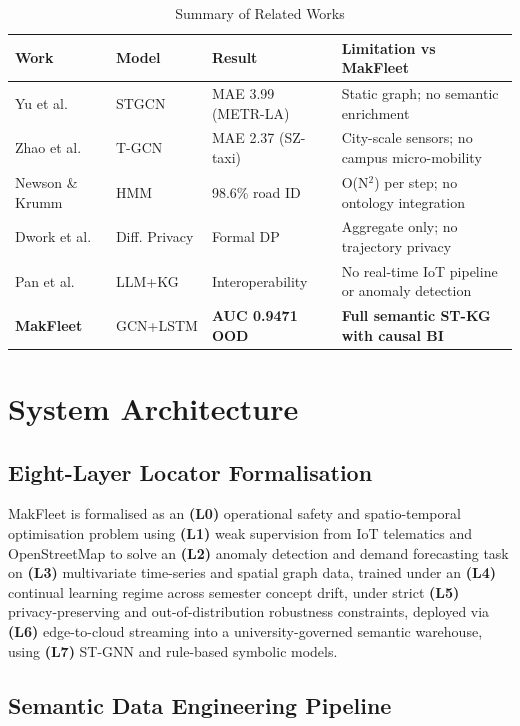 \documentclass[conference]{IEEEtran}
\begin{document}
\begin{table}[t]
\caption{Summary of Related Works}
\label{tab:related}
\centering
\small
\begin{tabular}{|p{1.6cm}|p{1.4cm}|p{1.7cm}|p{1.9cm}|}
\hline
\textbf{Work} & \textbf{Model} & \textbf{Result} &
\textbf{Limitation vs MakFleet} \\
\hline
Yu et al. \cite{yu2018} & STGCN & MAE 3.99 (METR-LA) &
Static graph; no semantic enrichment \\
\hline
Zhao et al. \cite{zhao2019} & T-GCN & MAE 2.37 (SZ-taxi) &
City-scale sensors; no campus micro-mobility \\
\hline
Newson \& Krumm \cite{newson2009} & HMM & 98.6\% road ID &
O(N$^2$) per step; no ontology integration \\
\hline
Dwork et al. \cite{dwork2006} & Diff. Privacy & Formal DP &
Aggregate only; no trajectory privacy \\
\hline
Pan et al. \cite{pan2024} & LLM+KG & Interoperability &
No real-time IoT pipeline or anomaly detection \\
\hline
\textbf{MakFleet} & GCN+LSTM & \textbf{AUC 0.9471 OOD} &
\textbf{Full semantic ST-KG with causal BI} \\
\hline
\end{tabular}
\end{table}


\section{System Architecture}

\subsection{Eight-Layer Locator Formalisation}

MakFleet is formalised as an \textbf{(L0)} operational safety and
spatio-temporal optimisation problem using \textbf{(L1)} weak
supervision from IoT telematics and OpenStreetMap to solve an
\textbf{(L2)} anomaly detection and demand forecasting task on
\textbf{(L3)} multivariate time-series and spatial graph data,
trained under an \textbf{(L4)} continual learning regime across
semester concept drift, under strict \textbf{(L5)}
privacy-preserving and out-of-distribution robustness constraints,
deployed via \textbf{(L6)} edge-to-cloud streaming into a
university-governed semantic warehouse, using \textbf{(L7)} ST-GNN
and rule-based symbolic models.

\subsection{Semantic Data Engineering Pipeline}
\end{document}
